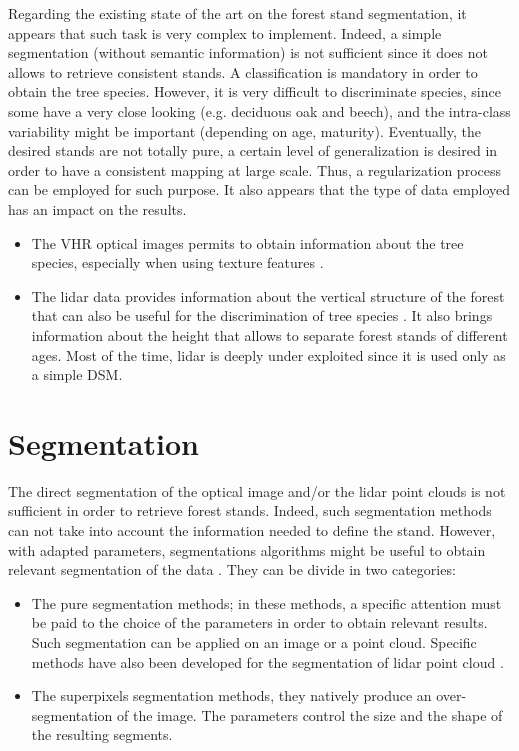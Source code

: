 Regarding the existing state of the art on the forest stand segmentation, it appears that such task is very complex to implement. Indeed, a simple segmentation (without semantic information) is not sufficient since it does not allows to retrieve consistent stands. A classification is mandatory in order to obtain the tree species. However, it is very difficult to discriminate species, since some have a very close looking (e.g. deciduous oak and beech), and the intra-class variability might be important (depending on age, maturity). Eventually, the desired stands are not totally pure, a certain level of generalization is desired in order to have a consistent mapping at large scale. Thus, a regularization process can be employed for such purpose.
It also appears that the type of data employed has an impact on the results.
\begin{itemize}
\item The VHR optical images permits to obtain information about the tree species, especially when using texture features \citep{franklin2000incorporating}.
\item The lidar data provides information about the vertical structure of the forest that can also be useful for the discrimination of tree species \citep{brandtberg2007classifying}. It also brings information about the height that allows to separate forest stands of different ages. Most of the time, lidar is deeply under exploited since it is used only as a simple DSM.
\end{itemize}

\section{Segmentation}
\label{sec:C1_seg}
The direct segmentation of the optical image and/or the lidar point clouds is not sufficient in order to retrieve forest stands. Indeed, such segmentation methods can not take into account the information needed to define the stand.  However, with adapted parameters, segmentations algorithms might be useful to obtain relevant segmentation of the data \citep{clement_IJPRS}. They can be divide in two categories:
\begin{itemize}
\item The pure segmentation methods; in these methods, a specific attention must be paid to the choice of the parameters in order to obtain relevant results. Such segmentation can be applied on an image or a point cloud. Specific methods have also been developed for the segmentation of lidar point cloud \citep{nguyen20133d}.
\item The superpixels segmentation methods, they natively produce an over-segmentation of the image. The parameters control the size and the shape of the resulting segments.
\end{itemize}

